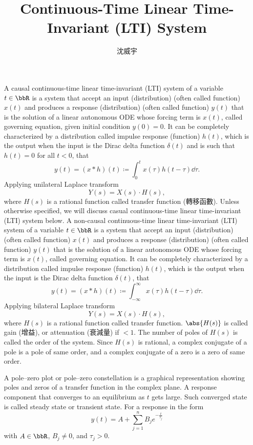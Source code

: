 \documentclass[a4paper,12pt]{report}
\begin{document}
\title{Continuous-Time Linear Time-Invariant (LTI) System}
\author{沈威宇}
\date{\temtoday}
\titletocdoc
{}
A causal continuous-time linear time-invariant (LTI) system of a variable $t\in\bbR$ is a system that accept an input (distribution) (often called function) $x(t)$ and produces a response (distribution) (often called function) $y(t)$ that is the solution of a linear autonomous ODE whose forcing term is $x(t)$, called governing equation, given initial condition $y(0)=0$. It can be completely characterized by a distribution called impulse response (function) $h(t)$, which is the output when the input is the Dirac delta function $\delta(t)$ and is such that $h(t)=0$ for all $t<0$, that
\[y(t)=(x*h)(t)\coloneq\int_0^tx(\tau)h(t-\tau)\dd{\tau}.\]
Applying unilateral Laplace transform
\[Y(s)=X(s)\cdot H(s),\]
where $H(s)$ is a rational function called transfer function (轉移函數). Unless otherwise specified, we will discuss casual continuous-time linear time-invariant (LTI) system below.
A non-causal continuous-time linear time-invariant (LTI) system of a variable $t\in\bbR$ is a system that accept an input (distribution) (often called function) $x(t)$ and produces a response (distribution) (often called function) $y(t)$ that is the solution of a linear autonomous ODE whose forcing term is $x(t)$, called governing equation. It can be completely characterized by a distribution called impulse response (function) $h(t)$, which is the output when the input is the Dirac delta function $\delta(t)$, that
\[y(t)=(x*h)(t)\coloneq\int_{-\infty}^{\infty} x(\tau)h(t-\tau)\dd{\tau}.\]
Applying bilateral Laplace transform
\[Y(s)=X(s)\cdot H(s),\]
where $H(s)$ is a rational function called transfer function.
$\abs{H(s)}$ is called gain (增益), or attenuation (衰減量) if $<1$.
The number of poles of $H(s)$ is called the order of the system.
Since $H(s)$ is rational, a complex conjugate of a pole is a pole of same order, and a complex conjugate of a zero is a zero of same order.

A pole–zero plot or pole–zero constellation is a graphical representation showing poles and zeros of a transfer function in the complex plane.
A response component that converges to an equilibrium as $t$ gets large. Such converged state is called steady state or transient state.
For a response in the form
\[y(t)=A+\sum_{j=1}^nB_je^{-\frac{t}{\tau_j}}\]
with $A\in\bbR$, $B_j\ne 0$, and $\tau_j>0$.
\end{document}
